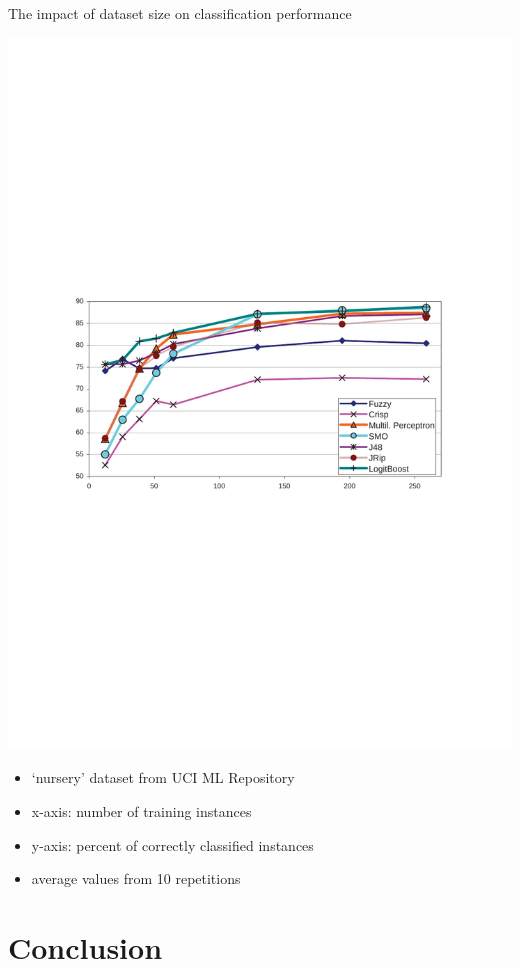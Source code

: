 \documentclass[xcolor=dvipsnames]{beamer}
\begin{document}
\begin{frame}{The impact of dataset size on classification performance}
\centerline{\includegraphics[width=1.0\hsize]{img/corect_growing_learninig_instances}}

\begin{itemize}
	\item `nursery' dataset from UCI ML Repository
	\item x-axis: number of training instances
	\item y-axis: percent of correctly classified instances
	\item average values from 10 repetitions
\end{itemize}
\end{frame}

\resetcolor

\section{Conclusion} 
\frame{\tableofcontents[currentsection]}
\end{document}

